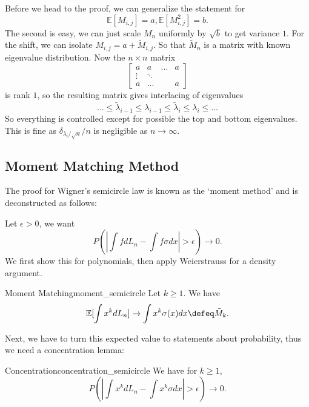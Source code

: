 Before we head to the proof, we can generalize the statement for \[
\mathbb{E}[M_{i,j}]=a, \mathbb{E}[M_{i,j}^2]=b.
\]
The second is easy, we can just scale $M_n$ uniformly by $\sqrt{b}$ to get variance $1$. For the shift, we can isolate $M_{i,j}=a+\tilde{M}_{i,j}$. So that $\tilde{M}_n$ is a matrix with known eigenvalue distribution. Now the $n\times n$ matrix\[
    \begin{bmatrix}
        a & a& ...& a\\
        \vdots& \ddots \\
        a & ... &&a
    \end{bmatrix}
\]
is rank $1$, so the resulting matrix gives interlacing of eigenvalues \[
...\leq \tilde{\lambda}_{i-1} \leq \lambda_{i-1} \leq \tilde{\lambda}_i \leq\lambda_i \leq ...
\]
So everything is controlled except for possible the top and bottom eigenvalues. This is fine as $\delta_{\lambda_i/\sqrt{n}}/n$ is negligible as $n\to \infty$.

\subsection*{Moment Matching Method}

The proof for Wigner's semicircle law is known as the `moment method' and is deconstructed as follows:

Let $\epsilon > 0 $, we want \[
P(|\int f d L_n - \int f  \sigma dx| > \epsilon )\to 0.
\]
We first show this for polynomials, then apply Weierstrauss for a density argument.
\begin{alemma}{Moment Matching}{moment_semicircle}
    Let $k\geq 1$. We have \[
    \mathbb{E}[\int x^k dL_n ]\to \int x^k \sigma(x) dx \defeq \tilde{M}_k.
    \]
\end{alemma}
Next, we have to turn this expected value to statements about probability, thus we need a concentration lemma: 

\begin{alemma}{Concentration}{concentration_semicircle}
    We have for $k\geq 1$, \[
    P(|\int x^k dL_n -\int x^k \sigma dx|>\epsilon )\to 0.
    \]
\end{alemma}

